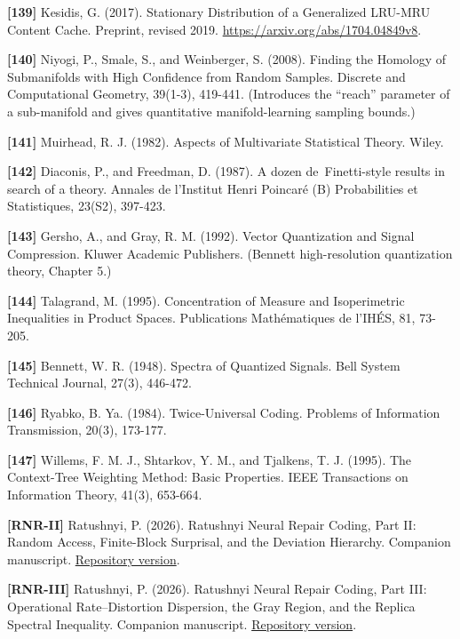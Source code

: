 \documentclass[
]{article}
\begin{document}
\textbf{{[}139{]}} Kesidis, G. (2017). Stationary Distribution of a
Generalized LRU-MRU Content Cache. Preprint, revised 2019.
\url{https://arxiv.org/abs/1704.04849v8}.

\textbf{{[}140{]}} Niyogi, P., Smale, S., and Weinberger, S. (2008).
Finding the Homology of Submanifolds with High Confidence from
Random Samples. Discrete and Computational Geometry, 39(1-3),
419-441. (Introduces the ``reach'' parameter of a sub-manifold and
gives quantitative manifold-learning sampling bounds.)

\textbf{{[}141{]}} Muirhead, R. J. (1982). Aspects of Multivariate
Statistical Theory. Wiley.

\textbf{{[}142{]}} Diaconis, P., and Freedman, D. (1987).
A dozen de~Finetti-style results in search of a theory. Annales de
l'Institut Henri Poincar\'e (B) Probabilities et Statistiques, 23(S2),
397-423.

\textbf{{[}143{]}} Gersho, A., and Gray, R. M. (1992). Vector
Quantization and Signal Compression. Kluwer Academic Publishers.
(Bennett high-resolution quantization theory, Chapter 5.)

\textbf{{[}144{]}} Talagrand, M. (1995). Concentration of Measure
and Isoperimetric Inequalities in Product Spaces. Publications
Math\'ematiques de l'IH\'ES, 81, 73-205.

\textbf{{[}145{]}} Bennett, W. R. (1948). Spectra of Quantized
Signals. Bell System Technical Journal, 27(3), 446-472.

\textbf{{[}146{]}} Ryabko, B. Ya. (1984). Twice-Universal Coding.
Problems of Information Transmission, 20(3), 173-177.

\textbf{{[}147{]}} Willems, F. M. J., Shtarkov, Y. M., and Tjalkens,
T. J. (1995). The Context-Tree Weighting Method: Basic Properties.
IEEE Transactions on Information Theory, 41(3), 653-664.


\textbf{{[}RNR-II{]}} Ratushnyi, P. (2026). Ratushnyi Neural Repair Coding,
Part II: Random Access, Finite-Block Surprisal, and the Deviation Hierarchy.
Companion manuscript. \href{https://github.com/ratushnyi-labs/sci-rnr/blob/b89507a8f3fe11f34ff931c8081d2b0507695041/tex/papers/random_access/rnr_random_access.tex}{Repository version}.

\textbf{{[}RNR-III{]}} Ratushnyi, P. (2026). Ratushnyi Neural Repair Coding,
Part III: Operational Rate--Distortion Dispersion, the Gray Region, and the Replica Spectral Inequality.
Companion manuscript. \href{https://github.com/ratushnyi-labs/sci-rnr/blob/b89507a8f3fe11f34ff931c8081d2b0507695041/tex/papers/dispersion/rnr_dispersion.tex}{Repository version}.
\end{document}
